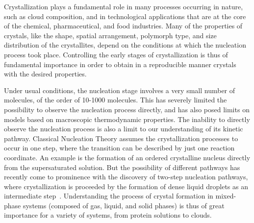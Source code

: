 \documentclass[preprint,amsmath,amssymb,superscriptaddress]{revtex4-1}
\begin{document}
\maketitle

Crystallization plays a fundamental role in many processes occurring in nature, such as cloud composition, and in technological applications
that are at the core of the chemical, pharmaceutical, and food industries.
Many of the properties of crystals, like the shape, spatial arrangement, polymorph type, and size distribution of the crystallites, depend on the conditions at which
the nucleation process took place. Controlling the early stages of crystallization is thus of fundamental importance in order to
obtain in a reproducible manner crystals with the desired properties. 

Under usual conditions, the nucleation stage involves a very small number of molecules, of the order of 10-1000 molecules.
This has severely limited the possibility to observe the nucleation process directly, and has also posed limits on
models based on macroscopic thermodynamic properties. 
The inability to directly observe the nucleation process is also a limit to our understanding of its kinetic pathway. 
Classical Nucleation Theory assumes the crystallization processes to occur in one step,
where the transition can be described by just one reaction coordinate. An example is the formation of an ordered crystalline nucleus
directly from the supersaturated solution. But the possibility of different pathways has recently come to prominence with
the discovery of two-step nucleation pathways, where crystallization is proceeded by the formation of dense liquid  droplets as an intermediate step~\cite{ten1997enhancement,SearR,savage2009experimental,vekilov2010two,palberg2014crystallization}.
Understanding the process of crystal formation in mixed-phase systems (composed of gas, liquid, and solid phases) is thus
of great importance for a variety of systems, from protein solutions to clouds. 
\end{document}
